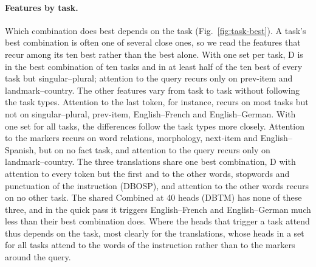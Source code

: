 \documentclass[10pt,a4paper]{article}
\begin{document}
\paragraph{Features by task.} Which combination does best depends on the task (Fig.~\ref{fig:task-best}). A task's best combination is often one of several close ones, so we read the features that recur among its ten best rather than the best alone. With one set per task, D is in the best combination of ten tasks and in at least half of the ten best of every task but singular--plural; attention to the query recurs only on prev-item and landmark--country. The other features vary from task to task without following the task types. Attention to the last token, for instance, recurs on most tasks but not on singular--plural, prev-item, English--French and English--German. With one set for all tasks, the differences follow the task types more closely. Attention to the markers recurs on word relations, morphology, next-item and English--Spanish, but on no fact task, and attention to the query recurs only on landmark--country. The three translations share one best combination, D with attention to every token but the first and to the other words, stopwords and punctuation of the instruction (DBOSP), and attention to the other words recurs on no other task. The shared Combined at 40 heads (DBTM) has none of these three, and in the quick pass it triggers English--French and English--German much less than their best combination does. Where the heads that trigger a task attend thus depends on the task, most clearly for the translations, whose heads in a set for all tasks attend to the words of the instruction rather than to the markers around the query.

\begin{table}[tbp]
\centering\small

\caption{LRP-Combined at every size: shared sets chosen among the combinations of relevance-weighted features (Sec.~\ref{sec:lrp}). Fold~1, Fold~2: the combination each fold selects at that size and its accuracy on the fold's own test half (mean over the 14 tasks, $\alpha$ cross-fitted as for every rule). Task, Control, Random: means of the two folds with the task's own means, the related task's means and the random sets. Combined, LRP-T: the shared sets of the same size (Tables~\ref{tab:selected-sizes} and~\ref{tab:ladder-acc}), for comparison.}
\label{tab:lrp-screen}
\end{table}
\end{document}
